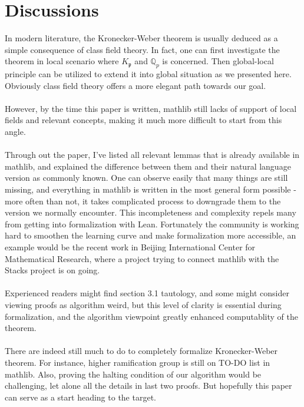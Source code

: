 \chapter{Discussions}
\label{cp:ds}
In modern literature, the Kronecker-Weber theorem is usually deduced as a simple consequence of class field theory. In fact, one can first investigate the theorem in local scenario where $K_\mathfrak{p}$ and $\mathbb{Q}_p$ is concerned. Then global-local principle can be utilized to extend it into global situation as we presented here. Obviously class field theory offers a more elegant path towards our goal.\\\\
However, by the time this paper is written, mathlib still lacks of support of local fields and relevant concepts, making it much more difficult to start from this angle.\\\\
Through out the paper, I've listed all relevant lemmas that is already available in mathlib, and explained the difference between them and their natural language version as commonly known. One can observe easily that many things are still missing, and everything in mathlib is written in the most general form possible - more often than not, it takes complicated process to downgrade them to the version we normally encounter. This incompleteness and complexity repels many from getting into formalization with Lean. Fortunately the community is working hard to smoothen the learning curve and make formalization more accessible, an example would be the recent work in Beijing International Center for Mathematical Research, where a project trying to connect mathlib with the Stacks project is on going.\\\\
Experienced readers might find section 3.1 tautology, and some might consider viewing proofs as algorithm weird, but this level of clarity is essential during formalization, and the algorithm viewpoint greatly enhanced computablity of the theorem.\\\\
There are indeed still much to do to completely formalize Kronecker-Weber theorem. For instance, higher ramification group is still on TO-DO list in mathlib. Also, proving the halting condition of our algorithm would be challenging, let alone all the details in last two proofs. But hopefully this paper can serve as a start heading to the target.